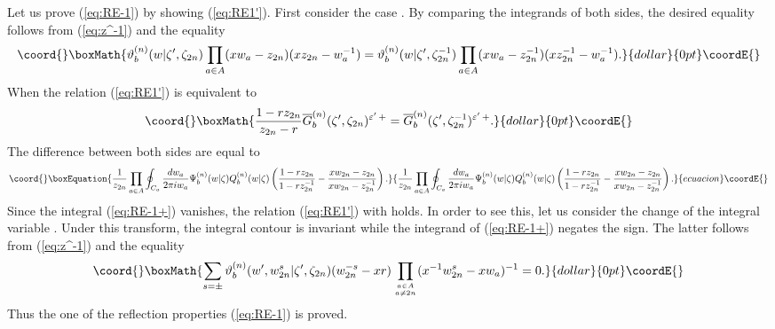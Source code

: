 \documentclass[a4paper,10pt]{article}
\begin{document}
{Let us prove (\ref{eq:RE-1}) by showing (\ref{eq:RE1'}). 
First consider the case \coordHE{}. By comparing 
the integrands of both sides, the desired equality follows 
from (\ref{eq:z^-1}) and the equality 
$$\coord{}\boxMath{
\vartheta^{(n)}_b(w|\zeta', \zeta_{2n})\prod_{a\in A} 
(xw_a -z_{2n})(xz_{2n}-w_a^{-1})=
\vartheta^{(n)}_b(w|\zeta', \zeta_{2n}^{-1})\prod_{a\in A} 
(xw_a -z_{2n}^{-1})(xz_{2n}^{-1}-w_a^{-1}). 
}{dollar}{0pt}\coordE{}$$
When \coordHE{} the relation (\ref{eq:RE1'}) 
is equivalent to 
$$\coord{}\boxMath{
\frac{1-rz_{2n}}{z_{2n}-r}
\overline{G}_{b}^{(n)} (\zeta', \zeta_{2n})^{
\varepsilon'\,+}
=\overline{G}_{b}^{(n)} 
(\zeta',\zeta_{2n}^{-1})^{\varepsilon'\,+}. 
}{dollar}{0pt}\coordE{}$$
The difference between both sides are equal to
\begin{equation}\coord{}\boxEquation{
\frac{1}{z_{2n}}\prod_{a\in A}\oint_{C_a} 
\dfrac{dw_a}{2\pi iw_a} 
\Psi_{b}^{(n)} (w|\zeta )
Q_b^{(n)}(w|\zeta)\left( 
\frac{1-rz_{2n}}{1-rz_{2n}^{-1}}-
\frac{xw_{2n}-z_{2n}}{xw_{2n}-z_{2n}^{-1}} \right). 
\label{eq:RE-1+}
}{
\frac{1}{z_{2n}}\prod_{a\in A}\oint_{C_a} 
\dfrac{dw_a}{2\pi iw_a} 
\Psi_{b}^{(n)} (w|\zeta )
Q_b^{(n)}(w|\zeta)\left( 
\frac{1-rz_{2n}}{1-rz_{2n}^{-1}}-
\frac{xw_{2n}-z_{2n}}{xw_{2n}-z_{2n}^{-1}} \right). 
}{ecuacion}\coordE{}\end{equation}
Since the integral (\ref{eq:RE-1+}) vanishes, 
the relation (\ref{eq:RE1'}) with \coordHE{} 
holds. In order to see this, let us consider the change of 
the integral variable \coordHE{}. Under 
this transform, the integral contour \coordHE{} is invariant 
while the integrand of (\ref{eq:RE-1+}) negates the sign. 
The latter follows from (\ref{eq:z^-1}) and the equality 
$$\coord{}\boxMath{
\sum_{s=\pm} \vartheta^{(n)}_b 
(w',w_{2n}^s|\zeta' ,\zeta_{2n})(w_{2n}^{-s}-xr)
\prod_{a\in A\atop a\neq 2n} (x^{-1}w_{2n}^s -xw_a )^{-1}
=0. 
}{dollar}{0pt}\coordE{}$$
Thus the one of the reflection properties (\ref{eq:RE-1}) 
is proved. 

}
\end{document}
